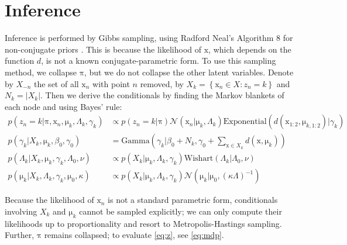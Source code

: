 \documentclass[english]{article}
\newcommand{\+}[1]{\ensuremath{\boldsymbol{\mathrm{#1}}}}
\begin{document}
\section{Inference}
Inference is performed by Gibbs sampling, using Radford Neal's Algorithm 8 for non-conjugate priors \cite{Neal2000}. This is because the likelihood of $\+x$, which depends on the function $d$, is not a known conjugate-parametric form. To use this sampling method, we collapse $\+\pi$, but we do not collapse the other latent variables. Denote by $X_{-n}$ the set of all $\+x_n$ with point $n$ removed, by $X_k = \left\{ \+x_n \in X : z_n = k \right\}$ and $N_k = | X_k |$. Then we derive the conditionals by finding the Markov blankets of each node and using Bayes' rule:
\begin{align}\label{eq:conds}
p(z_n = k | \+\pi, \+x_n, \+\mu_k, \Lambda_k, \gamma_k) &\propto p(z_n = k | \+\pi) \mathcal{N}(\+x_n | \+\mu_k, \Lambda_k) \text{Exponential}\left( d(\+x_{1:2}, \+\mu_{k,1:2}) | \gamma_k \right) \label{eq:z}\\
p(\gamma_k | X_k, \+\mu_k, \beta_0, \gamma_0) &= \text{Gamma}\left( \gamma_k | \beta_0 + N_k, \gamma_0 + \sum_{\+x \in X_k} d(\+x, \+\mu_k) \right) \label{eq:gamma}\\
p(\Lambda_k | X_k, \+\mu_k, \gamma_k, \Lambda_0, \nu) &\propto  p(X_k | \+\mu_k, \Lambda_k, \gamma_k) \text{Wishart}(\Lambda_k | \Lambda_0, \nu) \label{eq:lambda}\\
p(\+\mu_k | X_k, \Lambda_k, \gamma_k, \+\mu_0, \kappa) &\propto p(X_k | \+\mu_k, \Lambda_k, \gamma_k) \mathcal{N}(\+\mu_k | \+\mu_0, (\kappa\Lambda)^{-1}) \label{eq:mu}
\end{align}

Because the likelihood of $\+x_n$ is not a standard parametric form, conditionals involving $X_k$ and $\+\mu_k$ cannot be sampled explicitly; we can only compute their likelihoods up to proportionality and resort to Metropolis-Hastings sampling. Further, $\+\pi$ remains collapsed; to evaluate \eqref{eq:z}, see \eqref{eq:mdp}.
\end{document}
